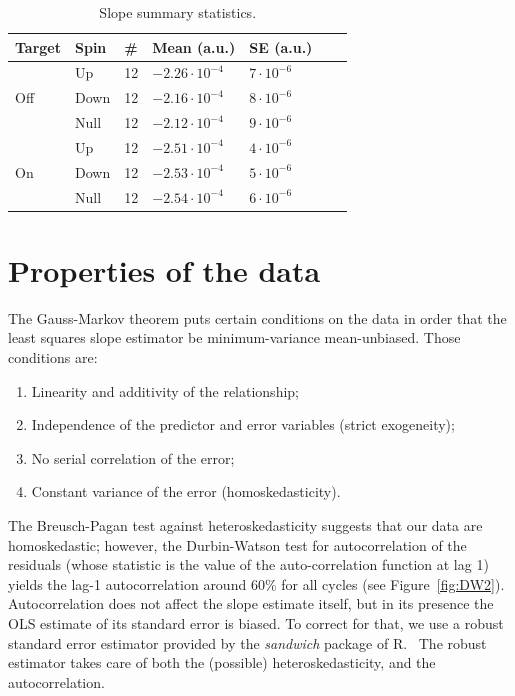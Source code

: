 \documentclass{article}
\begin{document}
\newcommand{\vp}[2]{#1\cdot10^{#2}}
\begin{table}[h]
	\centering
	\caption{Slope summary statistics.\label{tbl:SlpSumStat}}
	\begin{tabular}{lllllrr}
		\hline\hline
		       Target        & Spin & \# & Mean (a.u.)      & SE (a.u.)    \\ \hline
		\multirow{3}{*}{Off} & Up   & 12 & $\vp{-2.26}{-4}$ & $\vp{7}{-6}$ \\
		                     & Down & 12 & $\vp{-2.16}{-4}$ & $\vp{8}{-6}$ \\
		                     & Null & 12 & $\vp{-2.12}{-4}$ & $\vp{9}{-6}$ \\ \hline
		\multirow{3}{*}{On}  & Up   & 12 & $\vp{-2.51}{-4}$ & $\vp{4}{-6}$ \\
		                     & Down & 12 & $\vp{-2.53}{-4}$ & $\vp{5}{-6}$ \\
		                     & Null & 12 & $\vp{-2.54}{-4}$ & $\vp{6}{-6}$ \\ \hline
	\end{tabular}
\end{table}


\section{Properties of the data}
The Gauss-Markov theorem puts certain conditions on the data in order that the least squares slope estimator be minimum-variance mean-unbiased. Those conditions are:~\cite{GaussMarkov}
\begin{enumerate}
	\item Linearity and additivity of the relationship;
	\item Independence of the predictor and error variables (strict exogeneity);
	\item No serial correlation of the error;
	\item Constant variance of the error (homoskedasticity).
\end{enumerate}

The Breusch-Pagan test against heteroskedasticity suggests that our data are homoskedastic; however, the Durbin-Watson test for autocorrelation of the residuals (whose statistic is the value of the auto-correlation function at lag 1) yields the lag-1 autocorrelation around 60\% for all cycles (see Figure~\ref{fig:DW2}). Autocorrelation does not affect the slope estimate itself, but in its presence the OLS estimate of its standard error is biased. To correct for that, we use a robust standard error estimator provided by the \emph{sandwich} package of R.~\cite{RSandwich} The robust estimator takes care of both the (possible) heteroskedasticity, and the autocorrelation. 
\end{document}
